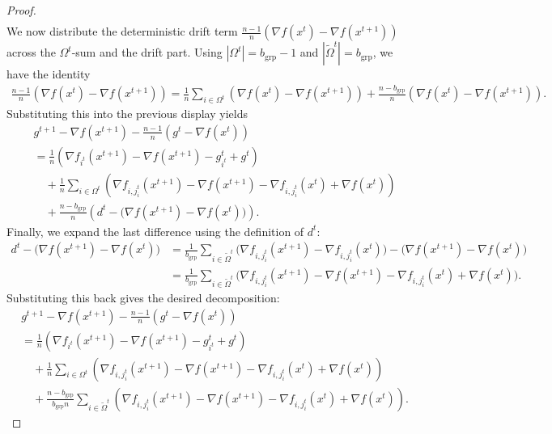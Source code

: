 \documentclass{article}
\theoremstyle{plain}
\begin{document}
\begin{proof}
\begin{align*}
\end{align*}
We now distribute the deterministic drift term $\frac{n-1}{n}\left(\nabla f(x^{t})-\nabla f(x^{t+1})\right)$ across the
$\Omega^t$-sum and the drift part. Using $|\Omega^t|=b_{\mathrm{grp}}-1$ and $|\tilde{\Omega}^t|=b_{\mathrm{grp}}$, we have the identity
\begin{align*}
\frac{n-1}{n}\left(\nabla f(x^{t})-\nabla f(x^{t+1})\right)
=\frac{1}{n}\sum_{i\in\Omega^t}\left(\nabla f(x^{t})-\nabla f(x^{t+1})\right)
+\frac{n-b_{\mathrm{grp}}}{n}\left(\nabla f(x^{t})-\nabla f(x^{t+1})\right).
\end{align*}
Substituting this into the previous display yields
\begin{align*}
&g^{t+1}-\nabla f(x^{t+1})-\frac{n-1}{n}\left(g^t-\nabla f(x^{t})\right)\\
&=\frac{1}{n}\left(\nabla f_{i^t}(x^{t+1})-\nabla f(x^{t+1})-g_{i^t}^t+g^t\right)\\
&\quad+\frac{1}{n}\sum_{i\in\Omega^t}\left(\nabla f_{i,j_i^t}(x^{t+1})-\nabla f(x^{t+1})-\nabla f_{i,j_i^t}(x^{t})+\nabla f(x^{t})\right)\\
&\quad+\frac{n-b_{\mathrm{grp}}}{n}\left(d^t-\big(\nabla f(x^{t+1})-\nabla f(x^{t})\big)\right).
\end{align*}
Finally, we expand the last difference using the definition of $d^t$:
\begin{align*}
d^t-\big(\nabla f(x^{t+1})-\nabla f(x^{t})\big)
&=\frac{1}{b_{\mathrm{grp}}}\sum_{i\in\tilde{\Omega}^t}\Big(\nabla f_{i,j_i^t}(x^{t+1})-\nabla f_{i,j_i^t}(x^{t})\Big)
-\big(\nabla f(x^{t+1})-\nabla f(x^{t})\big)\\
&=\frac{1}{b_{\mathrm{grp}}}\sum_{i\in\tilde{\Omega}^t}\Big(\nabla f_{i,j_i^t}(x^{t+1})-\nabla f(x^{t+1})-\nabla f_{i,j_i^t}(x^{t})+\nabla f(x^{t})\Big).
\end{align*}
Substituting this back gives the desired decomposition:
\begin{align*}
&g^{t+1}-\nabla f(x^{t+1})-\frac{n-1}{n}\left(g^t-\nabla f(x^{t})\right)\\
&=\frac{1}{n}\left(\nabla f_{i^t}(x^{t+1})-\nabla f(x^{t+1})-g_{i^t}^t+g^t\right)\\
&\quad+\frac{1}{n}\sum_{i\in\Omega^t}\left(\nabla f_{i,j_i^t}(x^{t+1})-\nabla f(x^{t+1})-\nabla f_{i,j_i^t}(x^{t})+\nabla f(x^{t})\right)\\
&\quad+\frac{n-b_{\mathrm{grp}}}{b_{\mathrm{grp}}n}\sum_{i\in \tilde{\Omega}^t}\left( \nabla f_{i,j_i^t}(x^{t+1})-\nabla f(x^{t+1})-\nabla f_{i,j_i^t}(x^{t})+\nabla f(x^{t})\right).

\end{align*}
\end{proof}
\end{document}
